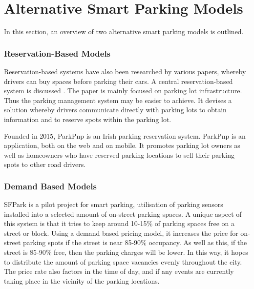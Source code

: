 \section{Alternative Smart Parking Models}
In this section, an overview of two alternative smart parking models is outlined.

\subsubsection{Reservation-Based Models}
Reservation-based systems have also been researched by various papers, whereby drivers can buy spaces before parking their cars. A central reservation-based system is discussed \citep{2}. The paper is mainly focused on parking lot infrastructure. Thus the parking management system may be easier to achieve. It devises a solution whereby drivers communicate directly with parking lots to obtain information and to reserve spots within the parking lot.

Founded in 2015, ParkPnp \citep{2015ParkPnp} is an Irish parking reservation system. ParkPnp is an application, both on the web and on mobile. It promotes parking lot owners as well as homeowners who have reserved parking locations to sell their parking spots to other road drivers.

\subsubsection{Demand Based Models}
SFPark \citep{12} is a pilot project for smart parking, utilisation of parking sensors installed into a selected amount of on-street parking spaces. A unique aspect of this system is that it tries to keep around 10-15\% of parking spaces free on a street or block. Using a demand based pricing model, it increases the price for on-street parking spots if the street is near 85-90\% occupancy. As well as this, if the street is 85-90\% free, then the parking charges will be lower. In this way, it hopes to distribute the amount of parking space vacancies evenly throughout the city. The price rate also factors in the time of day, and if any events are currently taking place in the vicinity of the parking locations.